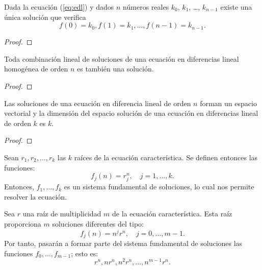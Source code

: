 \begin{frame}

\begin{theorem}
	Dada la ecuación (\ref{eq:edl}) y dados $n$ números reales $k_{0}$, $k_{1}$, \ldots, $k_{n-1}$ existe una única solución que verifica \[ f\left(0\right)=k_{0},f\left(1\right)=k_{1},\ldots,f\left(n-1\right)=k_{n-1}. \]
\end{theorem}
\begin{proof}
	
\end{proof}

\begin{theorem}
	Toda combinación lineal de soluciones de una ecuación en diferencias lineal homogénea de orden $n$ es también una solución.
\end{theorem}
\begin{proof}
	
\end{proof}

\begin{theorem}
	Las soluciones de una ecuación en diferencia lineal de orden $n$ forman un espacio vectorial y la dimensión del espacio solución de una ecuación en diferencias lineal de orden $k$ es $k$.
\end{theorem}
\begin{proof}
	
\end{proof}
\end{frame}

\begin{frame}
\begin{definition}
	Sean $r_{1}, r_{2},\ldots, r_{k}$ las $k$ raíces de la ecuación característica. Se definen entonces las funciones: \[ f_{j}(n)=r^{n}_{j},\quad j=1,\ldots,k. \] Entonces, $f_{1},\ldots,f_{k}$ es un sistema fundamental de soluciones, lo cual nos permite resolver la ecuación. %
\end{definition}

\begin{definition}
	Sea $r$ una raíz de multiplicidad $m$ de la ecuación característica. Esta raíz proporciona $m$ soluciones diferentes del tipo: \[ f_{j}(n)=n^{j}r^{n},\quad j= 0,\ldots,m-1. \] Por tanto, pasarán a formar parte del sistema fundamental de soluciones las funciones $f_{0},\ldots,f_{m-1}$; esto es: \[ r^{n},nr^{n},n^{2}r^{n},\ldots,n^{m-1}r^{n}. \]
\end{definition}
\end{frame}

